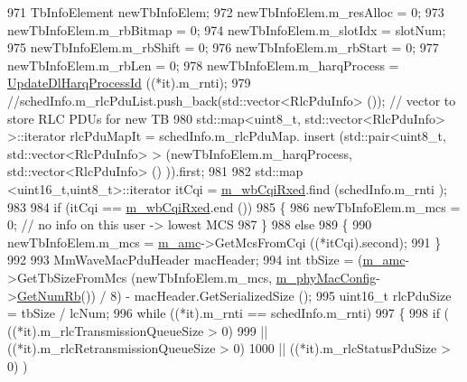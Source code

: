 \begin{DoxyCode}
{971                 TbInfoElement newTbInfoElem;
972                 newTbInfoElem.m\_resAlloc = 0;
973                 newTbInfoElem.m\_rbBitmap = 0;
974                 newTbInfoElem.m\_slotIdx = slotNum;
975                 newTbInfoElem.m\_rbShift = 0;
976                 newTbInfoElem.m\_rbStart = 0;
977                 newTbInfoElem.m\_rbLen = 0;
978                 newTbInfoElem.m\_harqProcess = \hyperlink{classns3_1_1MmWaveRrMacScheduler_a0c01cd018ece348fa17da5babacd3bae}{UpdateDlHarqProcessId} ((*it).m\_rnti);
979                 \textcolor{comment}{//schedInfo.m\_rlcPduList.push\_back(std::vector<RlcPduInfo> ());  // vector to store RLC
       PDUs for new TB}
980                 std::map<uint8\_t, std::vector<RlcPduInfo> >::iterator rlcPduMapIt = schedInfo.m\_rlcPduMap.
      insert (std::pair<uint8\_t, std::vector<RlcPduInfo> > (newTbInfoElem.m\_harqProcess, std::vector<RlcPduInfo> ()
       )).first;
981 
982                 std::map <uint16\_t,uint8\_t>::iterator itCqi = \hyperlink{classns3_1_1MmWaveRrMacScheduler_ab048c846f6d5d71795b65b9f91c6766a}{m\_wbCqiRxed}.find (schedInfo.m\_rnti
      );
983 
984                 \textcolor{keywordflow}{if} (itCqi == \hyperlink{classns3_1_1MmWaveRrMacScheduler_ab048c846f6d5d71795b65b9f91c6766a}{m\_wbCqiRxed}.end ())
985                 \{
986                         newTbInfoElem.m\_mcs = 0; \textcolor{comment}{// no info on this user -> lowest MCS}
987                 \}
988                 \textcolor{keywordflow}{else}
989                 \{
990                         newTbInfoElem.m\_mcs = \hyperlink{classns3_1_1MmWaveRrMacScheduler_abbcdddd7d8733f372963069e1d0395d3}{m\_amc}->GetMcsFromCqi ((*itCqi).second);
991                 \}
992 
993                 MmWaveMacPduHeader macHeader;
994                 \textcolor{keywordtype}{int} tbSize = (\hyperlink{classns3_1_1MmWaveRrMacScheduler_abbcdddd7d8733f372963069e1d0395d3}{m\_amc}->GetTbSizeFromMcs (newTbInfoElem.m\_mcs, 
      \hyperlink{classns3_1_1MmWaveMacScheduler_a24d7af4971d2e500fe543cefbafa2fd9}{m\_phyMacConfig}->\hyperlink{classns3_1_1MmWavePhyMacCommon_a4c5f323fd722d6eec52efda5d76f97ad}{GetNumRb}()) / 8) - macHeader.GetSerializedSize ();
995                 uint16\_t rlcPduSize = tbSize / lcNum;
996                 \textcolor{keywordflow}{while} ((*it).m\_rnti == schedInfo.m\_rnti)
997                 \{
998                         \textcolor{keywordflow}{if} ( ((*it).m\_rlcTransmissionQueueSize > 0)
999                                         || ((*it).m\_rlcRetransmissionQueueSize > 0)
1000                                         || ((*it).m\_rlcStatusPduSize > 0) )
}
\end{DoxyCode}
